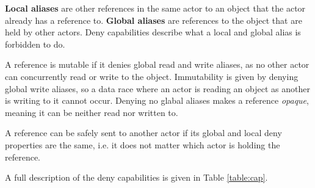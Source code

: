 \textbf{Local aliases} are other references in the same actor to an object that the actor already has a reference to. \textbf{Global aliases} are references to the object that are held by other actors. Deny capabilities describe what a local and global alias is forbidden to do.

A reference is mutable if it denies global read and write aliases, as no other actor can concurrently read or write to the object. Immutability is given by denying global write aliases, so a data race where an actor is reading an object as another is writing to it cannot occur. Denying no glabal aliases makes a reference \textit{opaque}, meaning it can be neither read nor written to.

A reference can be safely sent to another actor if its global and local deny properties are the same, i.e. it does not matter which actor is holding the reference.

A full description of the deny capabilities is given in Table \ref{table:cap}.

